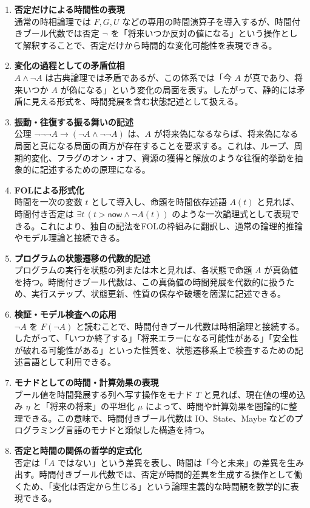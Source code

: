 \documentclass[10pt]{ltjsarticle}
\begin{document}
\begin{enumerate}[label=\arabic*.]
  \item \textbf{否定だけによる時間性の表現}\\
  通常の時相論理では $F, G, U$ などの専用の時間演算子を導入するが、時間付きブール代数では否定 $\neg$ を「将来いつか反対の値になる」という操作として解釈することで、否定だけから時間的な変化可能性を表現できる。

  \item \textbf{変化の過程としての矛盾位相}\\
  $A \land \neg A$ は古典論理では矛盾であるが、この体系では「今 $A$ が真であり、将来いつか $A$ が偽になる」という変化の局面を表す。したがって、静的には矛盾に見える形式を、時間発展を含む状態記述として扱える。

  \item \textbf{振動・往復する振る舞いの記述}\\
  公理 $\neg\neg\neg A \to (\neg A \land \neg\neg A)$ は、$A$ が将来偽になるならば、将来偽になる局面と真になる局面の両方が存在することを要求する。これは、ループ、周期的変化、フラグのオン・オフ、資源の獲得と解放のような往復的挙動を抽象的に記述するための原理になる。

  \item \textbf{FOLによる形式化}\\
  時間を一次の変数 $t$ として導入し、命題を時間依存述語 $A(t)$ と見れば、時間付き否定は $\exists t\,(t > \mathsf{now} \land \neg A(t))$ のような一次論理式として表現できる。これにより、独自の記法をFOLの枠組みに翻訳し、通常の論理的推論やモデル理論と接続できる。

  \item \textbf{プログラムの状態遷移の代数的記述}\\
  プログラムの実行を状態の列または木と見れば、各状態で命題 $A$ が真偽値を持つ。時間付きブール代数は、この真偽値の時間発展を代数的に扱うため、実行ステップ、状態更新、性質の保存や破壊を簡潔に記述できる。

  \item \textbf{検証・モデル検査への応用}\\
  $\neg A$ を $F(\neg A)$ と読むことで、時間付きブール代数は時相論理と接続する。したがって、「いつか終了する」「将来エラーになる可能性がある」「安全性が破れる可能性がある」といった性質を、状態遷移系上で検査するための記述言語として利用できる。

  \item \textbf{モナドとしての時間・計算効果の表現}\\
  ブール値を時間発展する列へ写す操作をモナド $T$ と見れば、現在値の埋め込み $\eta$ と「将来の将来」の平坦化 $\mu$ によって、時間や計算効果を圏論的に整理できる。この意味で、時間付きブール代数は IO、State、Maybe などのプログラミング言語のモナドと類似した構造を持つ。

  \item \textbf{否定と時間の関係の哲学的定式化}\\
  否定は「$A$ ではない」という差異を表し、時間は「今と未来」の差異を生み出す。時間付きブール代数では、否定が時間的差異を生成する操作として働くため、「変化は否定から生じる」という論理主義的な時間観を数学的に表現できる。
\end{enumerate}
\end{document}
